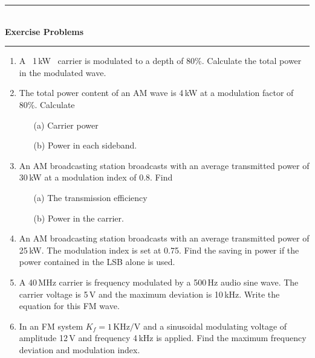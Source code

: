 \begin{center}
\rule{5cm}{1pt}\\[-2pt]
{\bf Exercise Problems}\\[-4pt]
\rule{5cm}{1pt}
\end{center}
\begin{enumerate}
\renewcommand{\labelenumi}{\bf\theenumi.}
\item A \ 1\,kW \ carrier is modulated to a depth of 80\%. Calculate the total power in the modulated wave.

\item The total power content of an AM wave is 4\,kW at a modulation factor of 80\%. Calculate
\begin{itemize}
\item[(a)] Carrier power

\item[(b)] Power in each sideband.
\end{itemize}

\item An AM broadcasting station broadcasts with an average transmitted power of 30\,kW at a modulation index of 0.8. Find
\begin{itemize}
\item[(a)] The transmission efficiency

\item[(b)] Power in the carrier.
\end{itemize}

\item An AM broadcasting station broadcasts with an average transmitted power of 25\,kW. The modulation index is set at 0.75. Find the saving in power if the power contained in the LSB alone is used.

\item A 40\,MHz carrier is frequency modulated by a 500\,Hz audio sine wave. The carrier voltage is 5\,V and the maximum deviation is 10\,kHz. Write the equation for this FM wave.

\item In an FM system $K_{f}=1\,\text{KHz/V}$ and a sinusoidal modulating voltage of amplitude 12\,V and frequency 4\,kHz is applied. Find the maximum frequency deviation and modulation index.
\end{enumerate}
